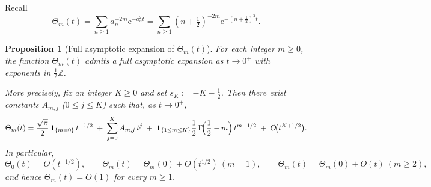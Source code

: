\documentclass[11pt,letterpaper]{amsart}
\numberwithin{equation}{section}
\newtheorem{proposition}[theorem]{Proposition}
\theoremstyle{definition}
\newcommand{\Z}{\mathbb{Z}}
\newcommand{\e}{\mathrm{e}}
\begin{document}
Recall
\[
\Theta_m(t)=\sum_{n\ge 1} a_n^{-2m}\e^{-a_n^2 t}
=\sum_{n\ge 1} (n+\tfrac12)^{-2m}\e^{-(n+\tfrac12)^2 t}.
\]

\begin{proposition}[Full asymptotic expansion of $\Theta_m(t)$]\label{prop:Theta-asymp}
For each integer $m\ge 0$, the function $\Theta_m(t)$ admits a full asymptotic expansion
as $t\to 0^+$ with exponents in $\tfrac12\Z$.

More precisely, fix an integer $K\ge 0$ and set $s_K:=-K-\tfrac12$. Then there exist
constants $A_{m,j}$ ($0\le j\le K$) such that, as $t\to 0^+$,
\begin{equation}\label{eq:Theta-K}
\Theta_m(t)
=\frac{\sqrt{\pi}}{2}\,\mathbf{1}_{\{m=0\}}\,t^{-1/2}
\;+\;\sum_{j=0}^{K}A_{m,j}\,t^{j}
\;+\;\mathbf{1}_{\{1\le m\le K\}}\frac12\,\Gamma\!\Bigl(\frac12-m\Bigr)\,t^{m-1/2}
\;+\;O\!\bigl(t^{K+1/2}\bigr).
\end{equation}
In particular,
\[
\Theta_0(t)=O(t^{-1/2}),\qquad
\Theta_m(t)=\Theta_m(0)+O(t^{1/2})\ (m=1),\qquad
\Theta_m(t)=\Theta_m(0)+O(t)\ (m\ge 2),
\]
and hence $\Theta_m(t)=O(1)$ for every $m\ge 1$.
\end{proposition}
\end{document}
